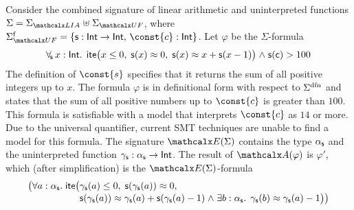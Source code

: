 \begin{example}
\label{ex:translation}
Consider the combined signature of linear arithmetic and uninterpreted
functions $\Sigma = \Sigmalia \mathrel{\uplus} \Sigma_{\euf}$, where
$\sfuns{\Sigma_{\euf}} = \{ \con{s} : { \typeint \rightarrow \typeint },\, \const{c} : { \typeint } \}$.
Let $\varphi$ be the $\Sigma$-formula
\begin{equation} \label{eq:ex-before}
\forallf{\con{s}} x : {\typeint}.\;\, \lite\bigl( x \leq 0,\; \con{s}(x) \teq 0,\;
  \con{s}( x ) \teq x + \con{s}( x - 1 ) \bigr) \wedge \con{s}( \con{c} ) > 100
\end{equation}
%
The definition of $\const{s}$ specifies that it returns the sum of all
positive integers up to $x$. The formula $\varphi$ is in definitional form with
respect to $\sfundefs{\Sigma}$ 
and states that the sum of all
positive numbers up to $\const{c}$ is greater than $100$. This formula is
satisfiable with a model that interprets $\const{c}$ as $14$ or more.
Due to the universal quantifier,
current SMT techniques
are unable to find
a model for this formula. The signature $\extendsig{\Sigma}$ contains the type
$\alpha_{\mathsf{s}}$ and the uninterpreted function $\gamma_{\mathsf{s}} : \alpha_{\mathsf{s}}
\rightarrow \mathsf{Int}$. The result of $\conv( \varphi )$ 
is $\varphi'$, which (after simplification) is the $\extendsig{\Sigma}$-formula
%
\begin{equation} \label{eq:ex-after}
\!\begin{aligned}[c]
  & \phantom{{\wedge}\; }\bigl(
      \forall a : \fargtype{\con{s}}.\; \lite\bigl(
        \!\begin{aligned}[t]
         &  \farg{\con{s}}( a ) \leq 0,\;
          \con{s}(\farg{\con{s}}( a )) \teq 0,\;
\\[-\jot]
  & \con{s}(\farg{\con{s}}( a )) \teq \farg{\con{s}}( a ) + \con{s}( \farg{\con{s}}( a )-1 )
    \wedge \exists b : {\fargtype{\con{s}}}.\;\, \farg{\con{s}}( b ) \teq \farg{\con{s}}( a )-1 \bigr) \bigr)

\end{aligned}
\end{aligned}
\end{equation}
\end{example}
